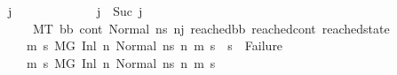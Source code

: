 \begin{isabellebody}
\ \ \ \ \ \ \ {\isachardoublequoteopen}{\isasymAnd}\ j{\isacharprime}{\kern0pt}{\isacharprime}{\kern0pt}{\isachardot}{\kern0pt}\ \isanewline
\ \ \ \ \ \ \ \ \ \ \ \ j{\isacharprime}{\kern0pt}\ {\isacharequal}{\kern0pt}\ Suc\ j{\isacharprime}{\kern0pt}{\isacharprime}{\kern0pt}\ {\isasymLongrightarrow}\ \ \ \ \ \ \ \ \ \ \ \ \ \ \ \ \ \ \ \ \ \ \ \ \ \ \ \isanewline
\ \ \ \ \ \ \ \ \ \ \ \ M{\isacharcomma}{\kern0pt}{\isasymLambda}{\isacharcomma}{\kern0pt}{\isasymGamma}{\isacharcomma}{\kern0pt}{\isasymOmega}{\isacharcomma}{\kern0pt}T\ {\isasymturnstile}{\isacharparenleft}{\kern0pt}bb{\isacharcomma}{\kern0pt}\ cont{}{\isacharcomma}{\kern0pt}\ Normal\ ns{}{\isacharprime}{\kern0pt}{\isacharprime}{\kern0pt}{\isacharparenright}{\kern0pt}\ {\isacharminus}{\kern0pt}n{\isasymlongrightarrow}{\isacharcircum}{\kern0pt}j{\isacharprime}{\kern0pt}{\isacharprime}{\kern0pt}\ {\isacharparenleft}{\kern0pt}reached{\isacharunderscore}{\kern0pt}bb{\isacharcomma}{\kern0pt}\ reached{\isacharunderscore}{\kern0pt}cont{\isacharcomma}{\kern0pt}\ reached{\isacharunderscore}{\kern0pt}state{\isacharparenright}{\kern0pt}\ {\isasymLongrightarrow}\isanewline
\ \ \ \ \ \ \ \ \ \ \ {\isacharparenleft}{\kern0pt}{\isasymAnd}m{\isacharprime}{\kern0pt}\ s{\isacharprime}{\kern0pt}{\isachardot}{\kern0pt}\ M{\isacharcomma}{\kern0pt}{\isasymLambda}{\isacharcomma}{\kern0pt}{\isasymGamma}{\isacharcomma}{\kern0pt}{\isasymOmega}{\isacharcomma}{\kern0pt}G\ {\isasymturnstile}{\isacharparenleft}{\kern0pt}Inl\ n{\isacharcomma}{\kern0pt}\ Normal\ ns{}{\isacharprime}{\kern0pt}{\isacharprime}{\kern0pt}{\isacharparenright}{\kern0pt}\ {\isacharminus}{\kern0pt}n{\isasymrightarrow}{\isacharasterisk}{\kern0pt}\ {\isacharparenleft}{\kern0pt}m{\isacharprime}{\kern0pt}{\isacharcomma}{\kern0pt}\ s{\isacharprime}{\kern0pt}{\isacharparenright}{\kern0pt}\ {\isasymLongrightarrow}\ s{\isacharprime}{\kern0pt}\ {\isasymnoteq}\ Failure{\isacharparenright}{\kern0pt}\ {\isasymLongrightarrow}\isanewline
\ \ \ \ \ \ \ \ \ \ \ {\isacharparenleft}{\kern0pt}{\isasymAnd}m{\isacharprime}{\kern0pt}\ s{\isacharprime}{\kern0pt}{\isachardot}{\kern0pt}\ {\isacharparenleft}{\kern0pt}M{\isacharcomma}{\kern0pt}{\isasymLambda}{\isacharcomma}{\kern0pt}{\isasymGamma}{\isacharcomma}{\kern0pt}{\isasymOmega}{\isacharcomma}{\kern0pt}G\ {\isasymturnstile}{\isacharparenleft}{\kern0pt}Inl\ n{\isacharcomma}{\kern0pt}\ Normal\ ns{}{\isacharprime}{\kern0pt}{\isacharprime}{\kern0pt}{\isacharparenright}{\kern0pt}\ {\isacharminus}{\kern0pt}n{\isasymrightarrow}{\isacharasterisk}{\kern0pt}\ {\isacharparenleft}{\kern0pt}m{\isacharprime}{\kern0pt}{\isacharcomma}{\kern0pt}\ s{\isacharprime}{\kern0pt}{\isacharparenright}{\kern0pt}{\isacharparenright}{\kern0pt}\ {\isasymLongrightarrow}\isanewline

\end{isabellebody}

